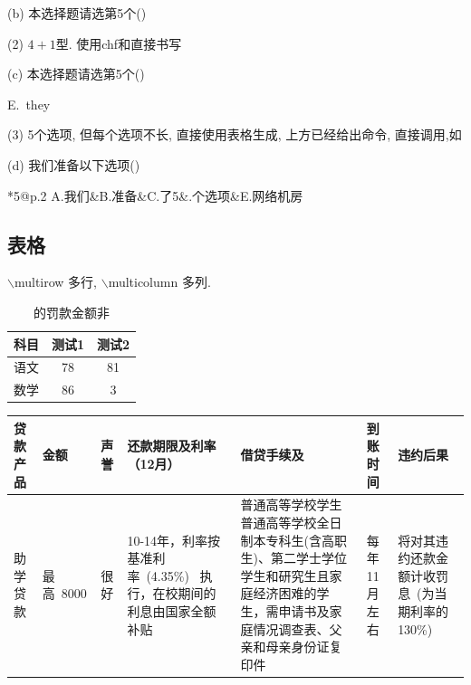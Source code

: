 \documentclass[a4paper,12pt,twoside]{ctexart}
\begin{document}
    \vspace*{-23pt}\def\mychA{D}\def\mychB{E}\def\mychC{F}
    \vspace*{-13pt}\def\mychA{A}\def\mychB{B}\def\mychC{C}

    (b) 本选择题请选第5个\hfill (\quad)

    \vspace*{-23pt}\def\mychA{D}\def\mychB{E}\def\mychC{F}
    \vspace*{-13pt}\def\mychA{A}\def\mychB{B}\def\mychC{C}

    (2) $4+1$型. 使用chf和直接书写

    (c) 本选择题请选第5个\hfill (\quad)

    E.\, they

    \newcommand{\chfive}[5]{\par\noindent
        \begin{tabular}{*{5}{@{}p{.2\textwidth}}}
                \mychA.#1&\mychB.#2&\mychC.#3&\mychD.#4&E.#5
            \end{tabular}}
    (3) 5个选项, 但每个选项不长, 直接使用表格生成, 上方已经给出命令, 直接调用,如

        (d) 我们准备以下选项\hfill (\quad)

        \chfive{我们}{准备}{了5}{个选项}{网络机房}


\subsection{表格}

$\backslash$multirow 多行,
$\backslash$multicolumn 多列.
\begin{table}[H]
\begin{center}
    \caption{\label{tabrecord}的罚款金额非}
    \begin{tabular}{|c|c|c|}
    \hline\hline
    科目&测试1&测试2\\ \hline
    语文&78&81\\ \hline
    数学&86&3\\ \hline\hline
    \end{tabular}
\end{center}
\end{table}

    \begin{center}
\begin{tabular}{
    |p{2\ccwd}<{\centering}|p{2\ccwd}<{\centering}| p{2\ccwd}<{\centering}| p{8\ccwd}<{\centering}| p{7\ccwd}<{\centering}| p{4\ccwd}<{\centering}| p{7\ccwd}<{\centering}|}\hline
    贷款产品&金额&声誉&还款期限及利率（12月）&借贷手续及&到账时间&违约后果\\\hline
    助学贷款&最高~8000&很好&10-14年，利率按基准利率~(4.35\%)~ 执行，在校期间的利息由国家全额补贴&普通高等学校学生普通高等学校全日制本专科生(含高职生)、第二学士学位学生和研究生且家庭经济困难的学生，需申请书及家庭情况调查表、父亲和母亲身份证复印件&每年11月左右&将对其违约还款金额计收罚息~(为当期利率的130\%)
    \end{tabular}
\end{center}
\end{document}
